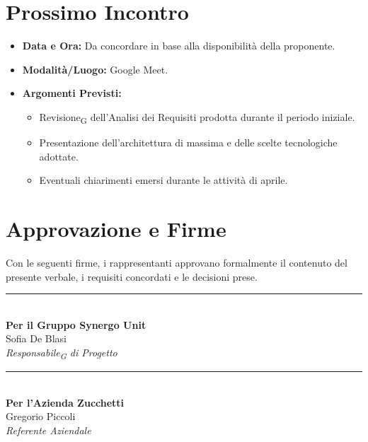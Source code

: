 \section{Prossimo Incontro}
 
\begin{itemize}
    \item \textbf{Data e Ora:} Da concordare in base alla disponibilità della proponente.
    \item \textbf{Modalità/Luogo:} Google Meet.
    \item \textbf{Argomenti Previsti:}
    \begin{itemize}
        \item Revisione\textsubscript{G} dell'Analisi dei Requisiti prodotta durante il periodo
              iniziale.
        \item Presentazione dell'architettura di massima e delle scelte
              tecnologiche adottate.
        \item Eventuali chiarimenti emersi durante le attività di aprile.
    \end{itemize}
\end{itemize}
 
\newpage
\section*{Approvazione e Firme}
Con le seguenti firme, i rappresentanti approvano formalmente il contenuto del presente verbale, i requisiti concordati e le decisioni prese.

\vspace{2.5cm}

\noindent
\begin{minipage}[c]{0.45\textwidth}
	\begin{center}
		\rule{6cm}{0.4pt} \\ 
		\vspace{0.2cm}
		\textbf{Per il Gruppo Synergo Unit} \\
		{Sofia De Blasi} \\
		\textit{Responsabile\textsubscript{G} di Progetto}
	\end{center}
\end{minipage}
\hfill
\begin{minipage}[c]{0.45\textwidth}
	\begin{center}
		\rule{6cm}{0.4pt} \\ 
		\vspace{0.2cm}
		\textbf{Per l'Azienda Zucchetti} \\
		{Gregorio Piccoli} \\
		\textit{Referente Aziendale}
	\end{center}
\end{minipage}

\vspace{2cm}
